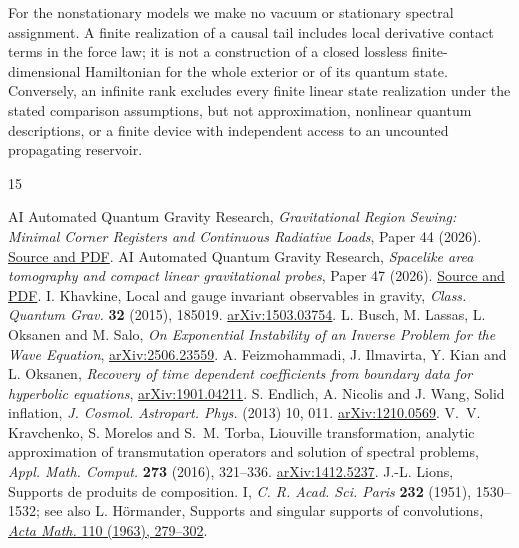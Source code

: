 \documentclass[11pt]{article}
\numberwithin{equation}{section}
\begin{document}
For the nonstationary models we make no vacuum or stationary spectral assignment. A finite realization of a causal tail includes local derivative contact terms in the force law; it is not a construction of a closed lossless finite-dimensional Hamiltonian for the whole exterior or of its quantum state. Conversely, an infinite rank excludes every finite linear state realization under the stated comparison assumptions, but not approximation, nonlinear quantum descriptions, or a finite device with independent access to an uncounted propagating reservoir.

\begin{thebibliography}{15}
\raggedright
{} AI Automated Quantum Gravity Research, \emph{Gravitational Region Sewing: Minimal Corner Registers and Continuous Radiative Loads}, Paper 44 (2026). \href{https://github.com/g3173028019-beep/ai-automated-quantum-gravity-research/tree/be3fc29a45b88b98fe5963888ed731a44d47ae59/papers/44-gravitational-region-sewing}{Source and PDF}.
 AI Automated Quantum Gravity Research, \emph{Spacelike area tomography and compact linear gravitational probes}, Paper 47 (2026). \href{https://github.com/g3173028019-beep/ai-automated-quantum-gravity-research/tree/be3fc29a45b88b98fe5963888ed731a44d47ae59/papers/47-spacelike-area-tomography}{Source and PDF}.
 I. Khavkine, Local and gauge invariant observables in gravity, \emph{Class. Quantum Grav.} \textbf{32} (2015), 185019. \href{https://arxiv.org/abs/1503.03754}{arXiv:1503.03754}.
 L. Busch, M. Lassas, L. Oksanen and M. Salo, \emph{On Exponential Instability of an Inverse Problem for the Wave Equation}, \href{https://arxiv.org/abs/2506.23559}{arXiv:2506.23559}.
 A. Feizmohammadi, J. Ilmavirta, Y. Kian and L. Oksanen, \emph{Recovery of time dependent coefficients from boundary data for hyperbolic equations}, \href{https://arxiv.org/abs/1901.04211}{arXiv:1901.04211}.
 S. Endlich, A. Nicolis and J. Wang, Solid inflation, \emph{J. Cosmol. Astropart. Phys.} (2013) 10, 011. \href{https://arxiv.org/abs/1210.0569}{arXiv:1210.0569}.
 V.~V. Kravchenko, S. Morelos and S.~M. Torba, Liouville transformation, analytic approximation of transmutation operators and solution of spectral problems, \emph{Appl. Math. Comput.} \textbf{273} (2016), 321--336. \href{https://arxiv.org/abs/1412.5237}{arXiv:1412.5237}.
 J.-L. Lions, Supports de produits de composition. I, \emph{C. R. Acad. Sci. Paris} \textbf{232} (1951), 1530--1532; see also L. H\"ormander, Supports and singular supports of convolutions, \href{https://doi.org/10.1007/BF02391861}{\emph{Acta Math.} 110 (1963), 279--302}.

\end{thebibliography}
\end{document}
